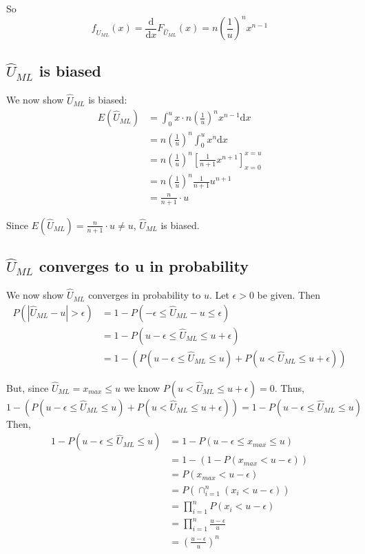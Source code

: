 \documentclass[paper=a4, fontsize=11pt]{scrartcl} %
\numberwithin{equation}{section} %
\numberwithin{figure}{section} %
\numberwithin{table}{section} %
\begin{document}
So
\[f_{\hat{U}_{ML}}(x) = \frac{\textrm{d}}{\textrm{d}x} F_{\hat{U}_{ML}}(x) = n \left(\frac{1}{u}\right)^n x^{n-1}\]

\subsection{$\hat{U}_{ML}$ is biased}
We now show $\hat{U}_{ML}$ is biased:
\begin{align*}
E(\hat{U}_{ML}) &= \int_0^u x \cdot n \left(\frac{1}{u}\right)^n x^{n-1} \textrm{d}x \\
   &=n \left(\frac{1}{u}\right)^n \int_0^u x^{n} \textrm{d}x \\
   &=n \left(\frac{1}{u}\right)^n \left[ \frac{1}{n+1} x^{n+1}\right]_{x = 0}^{x = u} \\
   &=n \left(\frac{1}{u}\right)^n  \frac{1}{n+1} u^{n+1} \\
   &=\frac{n}{n+1} \cdot u
\end{align*}

Since $E(\hat{U}_{ML}) = \frac{n}{n+1} \cdot u \neq u$, $\hat{U}_{ML}$ is biased.

\subsection{$\hat{U}_{ML}$ converges to u in probability}
We now show $\hat{U}_{ML}$ converges in probability to $u$. Let $\epsilon>0$ be given. Then
\begin{align*}
P\left(\left|\hat{U}_{ML} - u \right| > \epsilon \right) &= 1- P(-\epsilon \leq \hat{U}_{ML} - u \leq \epsilon) \\
   &= 1 - P(u-\epsilon \leq \hat{U}_{ML} \leq u + \epsilon) \\
   &= 1 - \left( P(u-\epsilon \leq \hat{U}_{ML} \leq u) + P(u < \hat{U}_{ML} \leq u + \epsilon) \right)
\end{align*}

But, since $\hat{U}_{ML} = x_{max} \leq u$ we know $P( u < \hat{U}_{ML} \leq u + \epsilon) = 0$. Thus,
\[1 - \left( P(u-\epsilon \leq \hat{U}_{ML} \leq u) + P(u < \hat{U}_{ML} \leq u + \epsilon) \right) = 1 - P(u - \epsilon \leq \hat{U}_{ML} \leq u)\]
Then,
\begin{align*}
1 - P(u - \epsilon \leq \hat{U}_{ML} \leq u) &= 1 - P(u-\epsilon \leq x_{max} \leq u)\\
   &= 1 - \left( 1- P(x_{max} < u - \epsilon) \right)\\
   &= P(x_{max} < u - \epsilon)\\
   &= P\left(\cap_{i = 1}^n (x_i < u - \epsilon)\right)\\
   &= \prod_{i = 1}^n P(x_i < u - \epsilon)\\
   &= \prod_{i = 1}^n \frac{u-\epsilon}{u}\\
   &= \left(\frac{u-\epsilon}{u}\right)^n
\end{align*}
\end{document}
